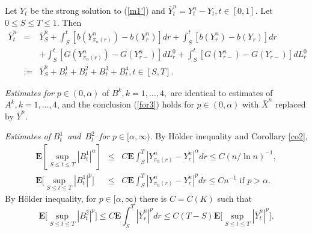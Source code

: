 \documentclass[11pt]{amsart}
\theoremstyle{plain}
\numberwithin{equation}{section}
\begin{document}
Let $Y_{t}$ be the strong solution to (\ref{m1'}) and $\bar{Y}_{t}^{n}=Y_{t}^{n}-Y_{t},t\in \left[ 0,1\right] $. Let $0\leq S\leq T\leq 1.$
Then\begin{eqnarray*}
\bar{Y}_{t}^{n} &=&\bar{Y}_{S}^{n}+\int_{S}^{t}[b\left( Y_{\pi _{n}\left(
r\right) }^{n}\right) -b\left( Y_{r}^{n}\right) ]dr+\int_{S}^{t}[b\left(
Y_{r}^{n}\right) -b\left( Y_{r}\right) ]dr \\
&&+\int_{S}^{t}[G\left( Y_{\pi _{n}\left( r\right) }^{n}\right) -G\left(
Y_{r-}^{n}\right) ]dL_{r}^{0}+\int_{S}^{t}[G\left( Y_{r-}^{n}\right)
-G\left( Y_{r-}\right) ]dL_{r}^{0} \\
&:=&\bar{Y}_{S}^{n}+B_{t}^{1}+B_{t}^{2}+B_{t}^{3}+B_{t}^{4},t\in \left[ S,T\right] .
\end{eqnarray*}

\emph{Estimates for \thinspace }$p\in \left( 0,\alpha \right) $ of $B^{k},k=1,\ldots ,4,$ are identical to estimates of $A^{k},k=1,\ldots ,4$,
and the conclusion (\ref{for3}) holds for $p\in \left( 0,\alpha \right) $
with $\bar{X}^{n}$ replaced by $\bar{Y}^{n}$.

\emph{Estimates of }$B_t^{1}$\emph{\ and}{\footnotesize \ }$B_t^{2}$\emph{\
for \thinspace }$p\in \lbrack \alpha ,\infty )$. By H\"{o}lder inequality
and Corollary \ref{co2},\begin{eqnarray*}
\mathbf{E}[\sup_{S\leq t\leq T}\left\vert B_{t}^{1}\right\vert ^{\alpha}]
&\leq &C\mathbf{E}\int_{S}^{T}\left\vert Y_{\pi _{n}\left( r\right)
}^{n}-Y_{r}^{n}\right\vert ^{\alpha}dr\leq C\left( n/\ln n\right) ^{-1} , \\
\mathbf{E[}\sup_{S\leq t\leq T}\left\vert B_{t}^{1}\right\vert ^{p}] &\leq &C\mathbf{E}\int_{S}^{T}\left\vert Y_{\pi _{n}\left( r\right)
}^{n}-Y_{r}^{n}\right\vert ^{p}dr\leq Cn^{-1}\text{ if }p>\alpha .
\end{eqnarray*}By H\"{o}lder inequality, for $p\in \lbrack \alpha ,\infty )$ there is $C=C\left( K\right) $ such that\begin{equation*}
\mathbf{E[}\sup_{S\leq t\leq T}\left\vert B_{t}^{2}\right\vert ^{p}]\leq C\mathbf{E}\int_{S}^{T}\left\vert \bar{Y}_{r}^{n}\right\vert ^{p}dr\leq
C\left( T-S\right) \mathbf{E[}\sup_{S\leq t\leq T}\left\vert \bar{Y}_{t}^{n}\right\vert ^{p}].
\end{equation*}
\end{document}
